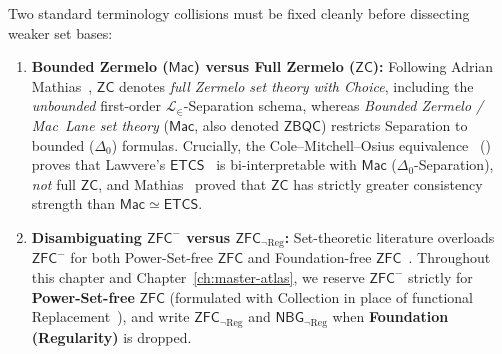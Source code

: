 \begin{remark}\label{rem:zfc-minus-notation}%
%
Two standard terminology collisions must be fixed cleanly before dissecting weaker set bases:
\begin{enumerate}
  \item \textbf{Bounded Zermelo ($\mathsf{Mac}$) versus Full Zermelo ($\mathsf{ZC}$):} Following Adrian Mathias~\cite{Mathias01}, $\mathsf{ZC}$ denotes \emph{full Zermelo set theory with Choice}, including the \emph{unbounded} first-order $\mathcal{L}_\in$-Separation schema, whereas \emph{Bounded Zermelo / Mac~Lane set theory} ($\mathsf{Mac}$, also denoted $\mathsf{ZBQC}$) restricts Separation to bounded ($\Delta_0$) formulas. Crucially, the Cole--Mitchell--Osius equivalence~\cite{Cole73,Mitchell72,Osius74} (\cite[Ch.~VI, \S 10]{MacLaneMoerdijk92}) proves that Lawvere's $\mathsf{ETCS}$~\cite{Lawvere64} is bi-interpretable with $\mathsf{Mac}$ ($\Delta_0$-Separation), \emph{not} full $\mathsf{ZC}$, and Mathias~\cite[pp.~107--234]{Mathias01} proved that $\mathsf{ZC}$ has strictly greater consistency strength than $\mathsf{Mac} \simeq \mathsf{ETCS}$.
  \item \textbf{Disambiguating $\mathsf{ZFC}^-$ versus $\mathsf{ZFC}_{\neg\mathrm{Reg}}$:} Set-theoretic literature overloads $\mathsf{ZFC}^-$ for both Power-Set-free $\mathsf{ZFC}$ and Foundation-free $\mathsf{ZFC}$~\cite{Felgner76}. Throughout this chapter and Chapter~\ref{ch:master-atlas}, we reserve $\mathsf{ZFC}^-$ strictly for \textbf{Power-Set-free} $\mathsf{ZFC}$ (formulated with Collection in place of functional Replacement~\cite{GitmanHamkinsJohnstone16}), and write $\mathsf{ZFC}_{\neg\mathrm{Reg}}$ and $\mathsf{NBG}_{\neg\mathrm{Reg}}$ when \textbf{Foundation (Regularity)} is dropped.
\end{enumerate}
\end{remark}

